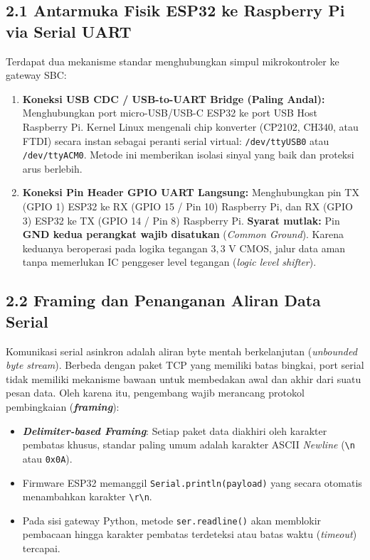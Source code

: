 \documentclass[11pt,a4paper]{article}
\begin{document}
\subsection*{2.1 Antarmuka Fisik ESP32 ke Raspberry Pi via Serial UART}
Terdapat dua mekanisme standar menghubungkan simpul mikrokontroler ke gateway SBC:
\begin{enumerate}
    \item \textbf{Koneksi USB CDC / USB-to-UART Bridge (Paling Andal):} Menghubungkan port micro-USB/USB-C ESP32 ke port USB Host Raspberry Pi. Kernel Linux mengenali chip konverter (CP2102, CH340, atau FTDI) secara instan sebagai peranti serial virtual: \texttt{/dev/ttyUSB0} atau \texttt{/dev/ttyACM0}. Metode ini memberikan isolasi sinyal yang baik dan proteksi arus berlebih.
    \item \textbf{Koneksi Pin Header GPIO UART Langsung:} Menghubungkan pin TX (GPIO 1) ESP32 ke RX (GPIO 15 / Pin 10) Raspberry Pi, dan RX (GPIO 3) ESP32 ke TX (GPIO 14 / Pin 8) Raspberry Pi. \textbf{Syarat mutlak:} Pin \textbf{GND kedua perangkat wajib disatukan} (\textit{Common Ground}). Karena keduanya beroperasi pada logika tegangan $3{,}3\text{ V}$ CMOS, jalur data aman tanpa memerlukan IC penggeser level tegangan (\textit{logic level shifter}).
\end{enumerate}

\subsection*{2.2 Framing dan Penanganan Aliran Data Serial}
Komunikasi serial asinkron adalah aliran byte mentah berkelanjutan (\textit{unbounded byte stream}). Berbeda dengan paket TCP yang memiliki batas bingkai, port serial tidak memiliki mekanisme bawaan untuk membedakan awal dan akhir dari suatu pesan data. Oleh karena itu, pengembang wajib merancang protokol pembingkaian (\textbf{\textit{framing}}):
\begin{itemize}
    \item \textbf{\textit{Delimiter-based Framing}}: Setiap paket data diakhiri oleh karakter pembatas khusus, standar paling umum adalah karakter ASCII \textit{Newline} (\texttt{\textbackslash n} atau \texttt{0x0A}).
    \item Firmware ESP32 memanggil \texttt{Serial.println(payload)} yang secara otomatis menambahkan karakter \texttt{\textbackslash r\textbackslash n}.
    \item Pada sisi gateway Python, metode \texttt{ser.readline()} akan memblokir pembacaan hingga karakter pembatas terdeteksi atau batas waktu (\textit{timeout}) tercapai.
\end{itemize}
\end{document}

